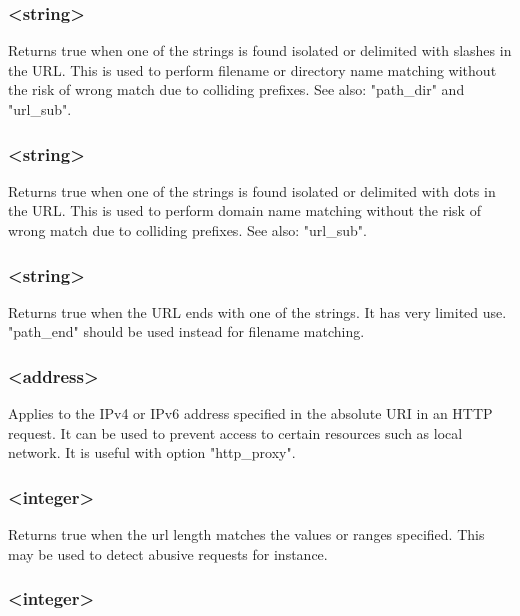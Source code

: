 \subsubsection[url\_dir]{ <string>}

  Returns true when one of the strings is found isolated or delimited with
  slashes in the URL. This is used to perform filename or directory name
  matching without the risk of wrong match due to colliding prefixes. See also:   "path\_dir" and "url\_sub".

\subsubsection[url\_dom]{ <string>}

  Returns true when one of the strings is found isolated or delimited with dots
  in the URL. This is used to perform domain name matching without the risk of
  wrong match due to colliding prefixes. See also: "url\_sub".

\subsubsection[url\_end]{ <string>}

  Returns true when the URL ends with one of the strings. It has very limited
  use. "path\_end" should be used instead for filename matching.

\subsubsection[url\_ip]{ <address>}

  Applies to the IPv4 or IPv6 address specified in the absolute URI in an HTTP
  request. It can be used to prevent access to certain resources such as local
  network. It is useful with option "http\_proxy".

\subsubsection[url\_len]{ <integer>}

  Returns true when the url length matches the values or ranges specified. This
  may be used to detect abusive requests for instance.

\subsubsection[url\_port]{ <integer>}

